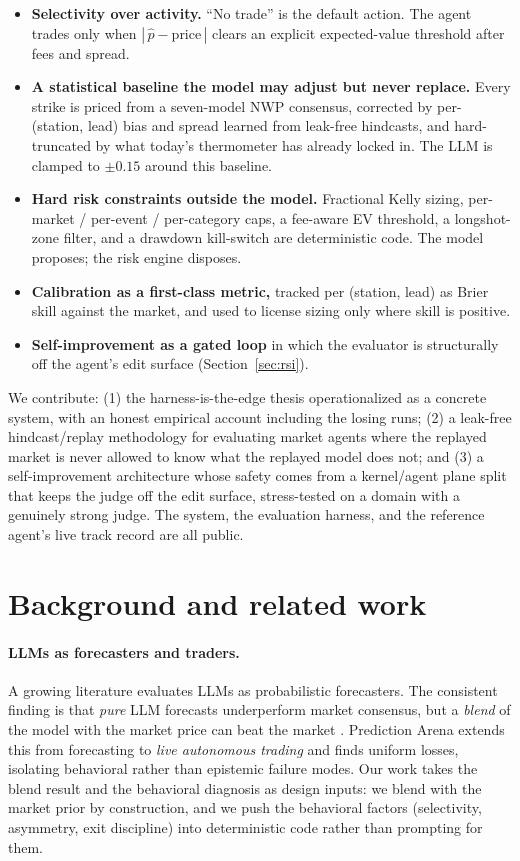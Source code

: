 \documentclass[10pt,twocolumn]{article}
\begin{document}
\begin{itemize}
\item \textbf{Selectivity over activity.} ``No trade'' is the default action.
The agent trades only when $|\,\hat{p}-\text{price}\,|$ clears an explicit
expected-value threshold after fees and spread.
\item \textbf{A statistical baseline the model may adjust but never replace.}
Every strike is priced from a seven-model NWP consensus, corrected by
per-(station, lead) bias and spread learned from leak-free hindcasts, and hard-
truncated by what today's thermometer has already locked in. The LLM is clamped
to $\pm 0.15$ around this baseline.
\item \textbf{Hard risk constraints outside the model.} Fractional Kelly sizing,
per-market / per-event / per-category caps, a fee-aware EV threshold, a
longshot-zone filter, and a drawdown kill-switch are deterministic code. The
model proposes; the risk engine disposes.
\item \textbf{Calibration as a first-class metric,} tracked per (station, lead)
as Brier skill against the market, and used to license sizing only where skill
is positive.
\item \textbf{Self-improvement as a gated loop} in which the evaluator is
structurally off the agent's edit surface (Section~\ref{sec:rsi}).
\end{itemize}

We contribute: (1) the harness-is-the-edge thesis operationalized as a concrete
system, with an honest empirical account including the losing runs; (2) a
leak-free hindcast/replay methodology for evaluating market agents where the
replayed market is never allowed to know what the replayed model does not; and
(3) a self-improvement architecture whose safety comes from a kernel/agent plane
split that keeps the judge off the edit surface, stress-tested on a domain with a
genuinely strong judge. The system, the evaluation harness, and the reference
agent's live track record are all public.

\section{Background and related work}

\paragraph{LLMs as forecasters and traders.} A growing literature evaluates LLMs
as probabilistic forecasters. The consistent finding is that \emph{pure} LLM
forecasts underperform market consensus, but a \emph{blend} of the model with the
market price can beat the market \cite{blend}. Prediction Arena \cite{predarena}
extends this from forecasting to \emph{live autonomous trading} and finds
uniform losses, isolating behavioral rather than epistemic failure modes. Our
work takes the blend result and the behavioral diagnosis as design inputs: we
blend with the market prior by construction, and we push the behavioral factors
(selectivity, asymmetry, exit discipline) into deterministic code rather than
prompting for them.
\end{document}
